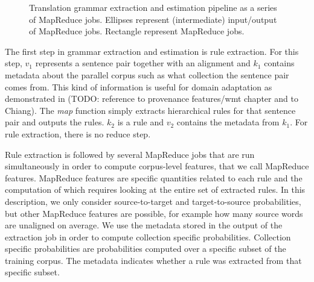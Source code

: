 \begin{figure}
\caption{Translation grammar extraction and estimation pipeline as a series of MapReduce jobs. Ellipses
represent (intermediate) input/output of MapReduce jobs. Rectangle represent
MapReduce jobs.}
\label{fig:ruleXtractionPipeline}
\end{figure}
%
The first step in grammar extraction and estimation is rule extraction. For
this step, $v_1$ represents a sentence pair together with an alignment and $k_1$
contains metadata about the parallel corpus such as what collection the sentence
pair comes from. This kind of information is useful for domain adaptation as
demonstrated in (TODO: reference to provenance features/wmt chapter and to Chiang). The \emph{map}
function simply extracts hierarchical rules for
that sentence pair and outputs the rules. $k_2$ is a rule and $v_2$ contains
the metadata from $k_1$. For rule extraction, there is no reduce step.

Rule extraction is followed by several MapReduce jobs that are run simultaneously
in order to
compute corpus-level features, that we call MapReduce features. MapReduce features
are specific quantities related
to each rule and the computation of which requires looking at the entire set of
extracted rules. In this description, we only consider source-to-target and
target-to-source probabilities, but other MapReduce features are possible,
for example how many source words are unaligned on average. We use the metadata stored in the output of the
extraction job in order to compute collection specific probabilities.
Collection specific probabilities are probabilities computed over a specific subset
of the training corpus. The metadata indicates whether a rule was extracted from
that specific subset.

